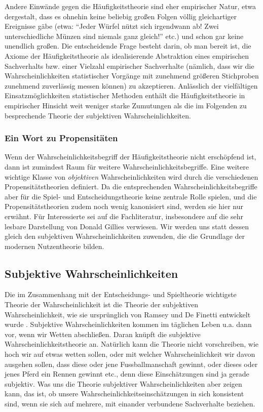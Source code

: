 Andere Einwände gegen die Häufigkeitstheorie sind eher empirischer Natur, etwa
dergestalt, dass es ohnehin keine beliebig großen Folgen völlig gleichartiger
Ereignisse gäbe (etwa: "`Jeder Würfel nützt sich irgendwann ab! Zwei
unterschiedliche Münzen sind niemals ganz gleich!"' etc.) und schon gar keine
unendlich großen. Die entscheidende Frage besteht darin, ob man bereit ist, die
Axiome der Häufigkeitstheorie als idealisierende Abstraktion eines empirischen
Sachverhalts bzw. einer Vielzahl empirischer Sachverhalte (nämlich, dass wir
die Wahrscheinlichkeiten statistischer Vorgänge mit zunehmend größeren
Stichproben zunehmend zuverlässig messen können) zu akzeptieren. Anlässlich der
vielfältigen Einsatzmöglichkeiten statistischer Methoden enthält die
Häufigkeitstheorie in empirischer Hinsicht weit weniger starke Zumutungen als
die im Folgenden zu besprechende Theorie der subjektiven Wahrscheinlichkeiten.

\subsubsection{Ein Wort zu Propensitäten}

Wenn der Wahrscheinlichkeitsbegriff der Häufigkeitstheorie nicht
erschöpfend ist, dann ist zumindest Raum für weitere
Wahrscheinlichkeitsbegriffe. Eine weitere wichtige Klasse von {\em objektiven}
Wahrscheinlichkeiten wird durch die verschiedenen Propensitätstheorien
definiert. Da die entsprechenden Wahrscheinlichkeitsbegriffe aber für die
Spiel- und Entscheidungstheorie keine zentrale Rolle spielen, und die
Propensitätstheorien zudem noch wenig kanonisiert sind, werden sie hier nur
erwähnt. Für Interessierte sei auf die Fachliteratur, insbesondere auf die
sehr lesbare Darstellung von Donald Gillies \cite[]{gillies:2000} verwiesen. 
Wir werden uns statt dessen gleich den subjektiven Wahrscheinlichkeiten
zuwenden, die die Grundlage der modernen Nutzentheorie bilden.

\subsection{Subjektive Wahrscheinlichkeiten}
\label{SubjektiveWahrscheinlichkeiten}
Die im Zusammenhang mit der Entscheidungs- und Spieltheorie wichtigste Theorie
der Wahrscheinlichkeit ist die Theorie der subjektiven Wahrscheinlichkeit, wie
sie ursprünglich von Ramsey und De Finetti entwickelt wurde \cite[p.
68ff.]{resnik:1987}. Subjektive Wahrscheinlichkeiten kommen im täglichen Leben u.a. dann vor, wenn
wir Wetten abschließen. Daran knüpft die subjektive Wahrscheinlichkeitstheorie
an. Natürlich kann die Theorie nicht vorschreiben, wie hoch wir auf etwas
wetten sollen, oder mit welcher Wahrscheinlichkeit wir davon ausgehen sollen,
dass diese oder jene Fussballmanschaft gewinnt, oder dieses oder jenes Pferd
ein Rennen gewinnt etc., denn diese Einschätzungen sind ja gerade subjektiv.
Was uns die Theorie subjektiver Wahrscheinlichkeiten aber zeigen kann,
das ist, ob unsere Wahrscheinlichkeitseinschätzungen in sich konsistent sind,
wenn sie sich auf mehrere, mit einander verbundene Sachverhalte beziehen.

